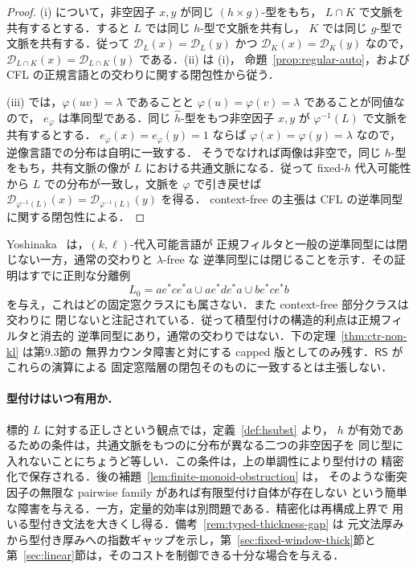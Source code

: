 \documentclass[11pt,a4paper]{ltjsarticle}
\theoremstyle{remark}
\theoremstyle{plain}
\newcommand{\D}{\mathcal{D}}
\begin{document}
\begin{proof}
(i) について，非空因子 $x,y$ が同じ $(h\times g)$-型をもち，
$L\cap K$ で文脈を共有するとする．すると $L$ では同じ $h$-型で文脈を共有し，
$K$ では同じ $g$-型で文脈を共有する．従って
$\D_L(x)=\D_L(y)$ かつ $\D_K(x)=\D_K(y)$ なので，
$\D_{L\cap K}(x)=\D_{L\cap K}(y)$ である．(ii) は (i)，
命題~\ref{prop:regular-auto}，および CFL の正規言語との交わりに関する閉包性から従う．

(iii) では，$\varphi(uv)=\lambda$ であることと
$\varphi(u)=\varphi(v)=\lambda$ であることが同値なので，
$e_\varphi$ は準同型である．同じ $\widehat h$-型をもつ非空因子 $x,y$ が
$\varphi^{-1}(L)$ で文脈を共有するとする．
$e_\varphi(x)=e_\varphi(y)=1$ ならば
$\varphi(x)=\varphi(y)=\lambda$ なので，逆像言語での分布は自明に一致する．
そうでなければ両像は非空で，同じ $h$-型をもち，共有文脈の像が
$L$ における共通文脈になる．従って fixed-$h$ 代入可能性から
$L$ での分布が一致し，文脈を $\varphi$ で引き戻せば
$\D_{\varphi^{-1}(L)}(x)=\D_{\varphi^{-1}(L)}(y)$ を得る．
context-free の主張は CFL の逆準同型に関する閉包性による．
\end{proof}

Yoshinaka~\cite[Proposition~1]{yoshinaka2008} は，$(k,\ell)$-代入可能言語が
正規フィルタと一般の逆準同型には閉じない一方，通常の交わりと $\lambda$-free な
逆準同型には閉じることを示す．その証明はすでに正則な分離例
\[
L_0=ae^*ce^*a\cup ae^*de^*a\cup be^*ce^*b
\]
を与え，これはどの固定窓クラスにも属さない．また context-free 部分クラスは交わりに
閉じないと注記されている．従って積型付けの構造的利点は正規フィルタと消去的
逆準同型にあり，通常の交わりではない．下の定理~\ref{thm:ctr-non-kl} は第9.3節の
無界カウンタ障害と対にする capped 版としてのみ残す．$\mathsf{RS}$ がこれらの演算による
固定窓階層の閉包そのものに一致するとは主張しない．

\paragraph{型付けはいつ有用か．}
標的 $L$ に対する正しさという観点では，定義~\ref{def:hsubst} より，
$h$ が有効であるための条件は，共通文脈をもつのに分布が異なる二つの非空因子を
同じ型に入れないことにちょうど等しい．この条件は，上の単調性により型付けの
精密化で保存される．後の補題~\ref{lem:finite-monoid-obstruction} は，
そのような衝突因子の無限な pairwise family があれば有限型付け自体が存在しない
という簡単な障害を与える．一方，定量的効率は別問題である．精密化は再構成上界で
用いる型付き文法を大きくし得る．備考~\ref{rem:typed-thickness-gap} は
元文法厚みから型付き厚みへの指数ギャップを示し，第~\ref{sec:fixed-window-thick}節と
第~\ref{sec:linear}節は，そのコストを制御できる十分な場合を与える．
\end{document}

